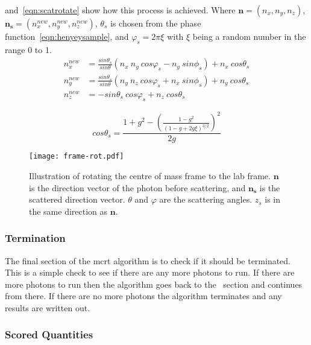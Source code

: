 \medskip

 and~\cref{eqn:scatrotate} show how this process is achieved.
Where $\mathbf{n}=(n_x,n_y,n_z)$, $\mathbf{n_s}=(n_{x}^{new},n_{y}^{new},n_{z}^{new})$, $\theta_s$ is chosen from the phase function~\cref{eqn:henyeysample}, and $\varphi_s=2\pi \xi$ with $\xi$ being a random number in the range 0 to 1.
\begin{equation}
	\begin{aligned}
		n_{x}^{new} &= \frac{sin\theta_s}{sin\theta} \left(n_x\ n_y\ cos\varphi_s - n_y\ sin\phi_s\right) + n_x\ cos\theta_s \\
		n_{y}^{new} &= \frac{sin\theta_s}{sin\theta} \left(n_y\ n_z\ cos\varphi_s + n_x\ sin\phi_s\right) + n_y\ cos\theta_s \\
		n_{z}^{new} &= -sin\theta_s\ cos\varphi_s + n_z\ cos\theta_s
	\end{aligned}
	\label{eqn:scatrotate}
\end{equation}

\begin{equation}
cos\theta_s = \frac{1+g^2-\left(\frac{1-g^2}{(1-g+2g\xi)^{3/2}}\right)^2}{2g}
\label{eqn:henyeysample}
\end{equation}


\begin{figure}[!htbp]
	\centering
	\texttt{[image: frame-rot.pdf]}
	\caption{Illustration of rotating the centre of mass frame to the lab frame. $\mathbf{n}$ is the direction vector of the photon before scattering, and $\mathbf{n_s}$ is the scattered direction vector. $\theta$ and $\varphi$ are the scattering angles. $z_s$ is in the same direction as $\mathbf{n}$.}
	\label{fig:labframerotate}
\end{figure}


\subsubsection*{Termination}\label{sec:terminator}

The final section of the \gls*{mcrt} algorithm is to check if it should be terminated. This is a simple check to see if there are any more photons to run.
If there are more photons to run then the algorithm goes back to the~ section and continues from there.
If there are no more photons the algorithm terminates and any results are written out.


\subsubsection*{Scored Quantities}\label{sec:fluencecalc}

